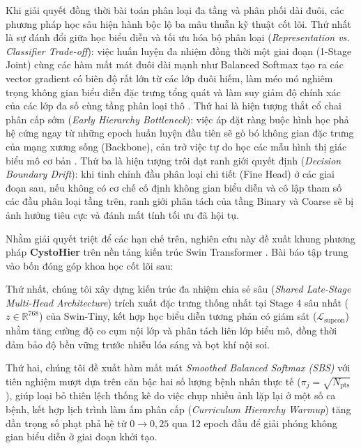 \documentclass[runningheads]{llncs}
\begin{document}
Khi giải quyết đồng thời bài toán phân loại đa tầng và phân phối dài đuôi, các phương pháp học sâu hiện hành bộc lộ ba mâu thuẫn kỹ thuật cốt lõi. Thứ nhất là sự đánh đổi giữa học biểu diễn và tối ưu hóa bộ phân loại (\textit{Representation vs. Classifier Trade-off}): việc huấn luyện đa nhiệm đồng thời một giai đoạn (1-Stage Joint) cùng các hàm mất mát đuôi dài mạnh như Balanced Softmax \cite{ref_ren2020balanced} tạo ra các vector gradient có biên độ rất lớn từ các lớp đuôi hiếm, làm méo mó nghiêm trọng không gian biểu diễn đặc trưng tổng quát và làm suy giảm độ chính xác của các lớp đa số cùng tầng phân loại thô \cite{ref_kang2020decoupling}. Thứ hai là hiện tượng thắt cổ chai phân cấp sớm (\textit{Early Hierarchy Bottleneck}): việc áp đặt ràng buộc hình học phả hệ cứng ngay từ những epoch huấn luyện đầu tiên sẽ gò bó không gian đặc trưng của mạng xương sống (Backbone), cản trở việc tự do học các mẫu hình thị giác biểu mô cơ bản \cite{ref_liu2021swin}. Thứ ba là hiện tượng trôi dạt ranh giới quyết định (\textit{Decision Boundary Drift}): khi tinh chỉnh đầu phân loại chi tiết (Fine Head) ở các giai đoạn sau, nếu không có cơ chế cố định không gian biểu diễn và cô lập tham số các đầu phân loại tầng trên, ranh giới phân tách của tầng Binary và Coarse sẽ bị ảnh hưởng tiêu cực và đánh mất tính tối ưu đã hội tụ.

Nhằm giải quyết triệt để các hạn chế trên, nghiên cứu này đề xuất khung phương pháp \textbf{CystoHier} trên nền tảng kiến trúc Swin Transformer \cite{ref_liu2021swin}. Bài báo tập trung vào bốn đóng góp khoa học cốt lõi sau:

Thứ nhất, chúng tôi xây dựng kiến trúc đa nhiệm chia sẻ sâu (\textit{Shared Late-Stage Multi-Head Architecture}) trích xuất đặc trưng thống nhất tại Stage 4 sâu nhất ($z \in \mathbb{R}^{768}$) của Swin-Tiny, kết hợp học biểu diễn tương phản có giám sát ($\mathcal{L}_{\text{supcon}}$) \cite{ref_khosla2020supervised} nhằm tăng cường độ co cụm nội lớp và phân tách liên lớp biểu mô, đồng thời đảm bảo độ bền vững trước nhiễu lóa sáng và bọt khí nội soi.

Thứ hai, chúng tôi đề xuất hàm mất mát \textit{Smoothed Balanced Softmax (SBS)} với tiên nghiệm mượt dựa trên căn bậc hai số lượng bệnh nhân thực tế ($\pi_j = \sqrt{N_{\text{pts}}}$), giúp loại bỏ thiên lệch thống kê do việc chụp nhiều ảnh lặp lại ở một số ca bệnh, kết hợp lịch trình làm ấm phân cấp (\textit{Curriculum Hierarchy Warmup}) tăng dần trọng số phạt phả hệ từ $0 \to 0{,}25$ qua 12 epoch đầu để giải phóng không gian biểu diễn ở giai đoạn khởi tạo.
\end{document}
